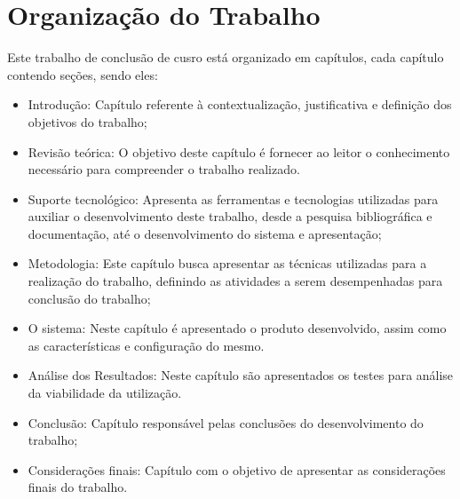 \section{Organização do Trabalho}

Este trabalho de conclusão de cusro está organizado em capítulos, cada capítulo contendo
seções, sendo eles:
\begin{itemize}
  \item Introdução: Capítulo referente à contextualização, justificativa e definição dos objetivos do trabalho;

			\item Revisão teórica: O objetivo deste capítulo é fornecer ao leitor o conhecimento necessário para compreender o trabalho realizado.

			\item Suporte tecnológico: Apresenta as ferramentas e tecnologias utilizadas para auxiliar o desenvolvimento deste trabalho,
       desde a pesquisa bibliográfica e documentação, até o desenvolvimento do sistema e apresentação;

			\item Metodologia: Este capítulo busca apresentar as técnicas utilizadas para a realização do trabalho,
       definindo as atividades a serem desempenhadas para conclusão do trabalho;

      \item O sistema: Neste capítulo é apresentado o produto desenvolvido,
       assim como as características e configuração do mesmo.

			\item Análise dos Resultados: Neste capítulo são apresentados os testes para análise
da viabilidade da utilização.

      \item Conclusão: Capítulo responsável pelas conclusões do desenvolvimento do trabalho;

			\item Considerações finais: Capítulo com o objetivo de apresentar as considerações finais do trabalho.
    \end{itemize}
